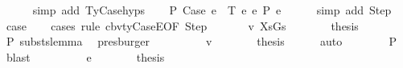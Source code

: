 \begin{isabellebody}
\ \ \ \ \isamarkupfalse%
\ {\isacharparenleft}{\kern0pt}simp\ add{\isacharcolon}{\kern0pt}\ TyCase{\isachardot}{\kern0pt}hyps{\isacharparenleft}{\kern0pt}{}{\isacharparenright}{\kern0pt}{\isacharparenright}{\kern0pt}\isanewline
\ \ \isamarkupfalse%
\ P{}{\isacharcolon}{\kern0pt}\ {\isachardoublequoteopen}Case\ e{}{\isacharprime}{\kern0pt}\ {\isasymGamma}{}{\isacharprime}{\kern0pt}\ T\ e{}{\isacharprime}{\kern0pt}\ e{}{\isacharprime}{\kern0pt}\ {\isacharminus}{\kern0pt}{\isachargreater}{\kern0pt}{\isacharbraceleft}{\kern0pt}P{\isacharbraceright}{\kern0pt}\ e{\isacharprime}{\kern0pt}{\isachardoublequoteclose}\isanewline
\ \ \ \ \isamarkupfalse%
\ {\isacharparenleft}{\kern0pt}simp\ add{\isacharcolon}{\kern0pt}\ Step{\isacharparenright}{\kern0pt}\isanewline
\isanewline
\ \ \isamarkupfalse%
\ {\isacharquery}{\kern0pt}case\isanewline
\ \ \isamarkupfalse%
\ {\isacharparenleft}{\kern0pt}cases\ rule{\isacharcolon}{\kern0pt}\ cbv{\isacharunderscore}{\kern0pt}ty{\isacharunderscore}{\kern0pt}CaseE{\isacharbrackleft}{\kern0pt}OF\ Step{\isacharbrackright}{\kern0pt}{\isacharparenright}{\kern0pt}\isanewline
\ \ \ \ \isamarkupfalse%
\ {\isacharparenleft}{\kern0pt}{}\ v\ XsGs{\isacharparenright}{\kern0pt}\isanewline
\ \ \ \ \isamarkupfalse%
\ \isamarkupfalse%
\ {\isacharquery}{\kern0pt}thesis\isanewline
\ \ \ \ \ \ \isamarkupfalse%
\ P{}\ substs{\isacharunderscore}{\kern0pt}lemma\ \isamarkupfalse%
\ presburger\isanewline
\ \ \isamarkupfalse%
\isanewline
\ \ \ \ \isamarkupfalse%
\ {\isacharparenleft}{\kern0pt}{}\ v{\isacharparenright}{\kern0pt}\isanewline
\ \ \ \ \isamarkupfalse%
\ \isamarkupfalse%
\ {\isacharquery}{\kern0pt}thesis\isanewline
\ \ \ \ \isamarkupfalse%
\ auto\isanewline
\ \ \ \ \ \ \isamarkupfalse%
\ P{}\ \isamarkupfalse%
\ blast\isanewline
\ \ \isamarkupfalse%
\isanewline
\ \ \ \ \isamarkupfalse%
\ {\isacharparenleft}{\kern0pt}{}\ e{}{\isacharprime}{\kern0pt}{\isacharparenright}{\kern0pt}\isanewline
\ \ \ \ \isamarkupfalse%
\ \isamarkupfalse%
\ {\isacharquery}{\kern0pt}thesis\isanewline
\ \ \ \ \isamarkupfalse%

\end{isabellebody}
